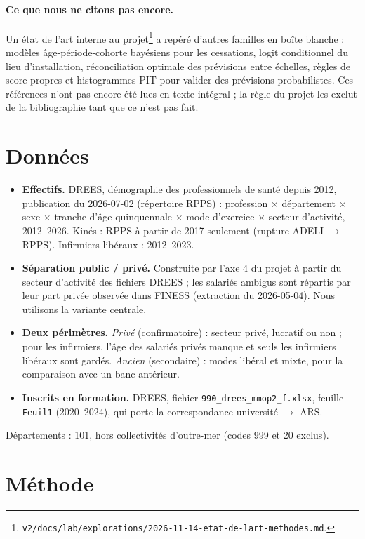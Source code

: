 \documentclass[11pt]{article}
\begin{document}
\paragraph{Ce que nous ne citons pas encore.} Un état de l'art interne au
projet\footnote{\texttt{v2/docs/lab/explorations/2026-11-14-etat-de-lart-methodes.md}.} a repéré
d'autres familles en boîte blanche : modèles âge-période-cohorte bayésiens pour les cessations,
logit conditionnel du lieu d'installation, réconciliation optimale des prévisions entre échelles,
règles de score propres et histogrammes PIT pour valider des prévisions probabilistes. Ces références
n'ont pas encore été lues en texte intégral ; la règle du projet les exclut de la bibliographie tant
que ce n'est pas fait.

\section{Données}
\begin{itemize}
  \item \textbf{Effectifs.} DREES, démographie des professionnels de santé depuis 2012, publication du
        2026-07-02 (répertoire RPPS) : profession $\times$ département $\times$ sexe $\times$ tranche
        d'âge quinquennale $\times$ mode d'exercice $\times$ secteur d'activité, 2012--2026. Kinés : RPPS
        à partir de 2017 seulement (rupture ADELI $\to$ RPPS). Infirmiers libéraux : 2012--2023.
  \item \textbf{Séparation public / privé.} Construite par l'axe 4 du projet à partir du secteur
        d'activité des fichiers DREES ; les salariés ambigus sont répartis par leur part privée
        observée dans FINESS (extraction du 2026-05-04). Nous utilisons la variante centrale.
  \item \textbf{Deux périmètres.} \emph{Privé} (confirmatoire) : secteur privé, lucratif ou non ; pour
        les infirmiers, l'âge des salariés privés manque et seuls les infirmiers libéraux sont gardés.
        \emph{Ancien} (secondaire) : modes libéral et mixte, pour la comparaison avec un banc antérieur.
  \item \textbf{Inscrits en formation.} DREES, fichier \texttt{990\_drees\_mmop2\_f.xlsx}, feuille
        \texttt{Feuil1} (2020--2024), qui porte la correspondance université $\to$ ARS.
\end{itemize}
Départements : 101, hors collectivités d'outre-mer (codes 999 et 20 exclus).

\section{Méthode}
\end{document}
